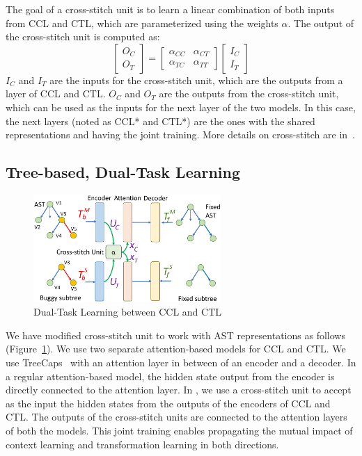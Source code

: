 The goal of a cross-stitch unit is to learn a linear combination of
both inputs from CCL and CTL, which are parameterized
using the weights $\alpha$. The output of the cross-stitch unit is
computed as:
\begin{equation}\label{eq:cross-stitch}
	\begin{bmatrix}
		O_C\\
		O_T
	\end{bmatrix}
	=
	\begin{bmatrix}
		\alpha_{CC} &  \alpha_{CT} \\
		\alpha_{TC} &  \alpha_{TT}
	\end{bmatrix}
	\begin{bmatrix}
		I_C\\
		I_T
	\end{bmatrix}
\end{equation}
$I_C$ and $I_T$ are the inputs for the cross-stitch unit, which are
the outputs from a layer of CCL and CTL. $O_C$ and $O_T$ are the
outputs from the cross-stitch unit, which can be used as the inputs
for the next layer of the two models. In this case, the next layers
(noted as CCL* and CTL*) are the ones with the shared representations
and having the joint training. More details on cross-stitch are
in~\cite{misra2016cross}.

\subsection{Tree-based, Dual-Task Learning}

\begin{figure}[t]
	\centering
	\includegraphics[width=2.8in]{graphs/dual-learning-repair.png}
        \vspace{-9pt}
	\caption{Dual-Task Learning between CCL and CTL}
	\label{fig:dual-learning}
\end{figure}

We have modified cross-stitch unit to work with AST representations as
follows (Figure~\ref{fig:dual-learning}). We use two separate
attention-based  models for CCL and CTL.
We use TreeCaps~\cite{bui2021treecaps} with an attention layer in
between of an encoder and a decoder. In a regular attention-based
 model, the hidden state output from the encoder is
directly connected to the attention layer. In {\tool}, we use a
cross-stitch unit to accept as the input the hidden states from the
outputs of the encoders of CCL and CTL. The outputs of the
cross-stitch units are connected to the attention layers of both the
models. This joint training enables propagating the mutual
impact of context learning and transformation learning in both
directions.


